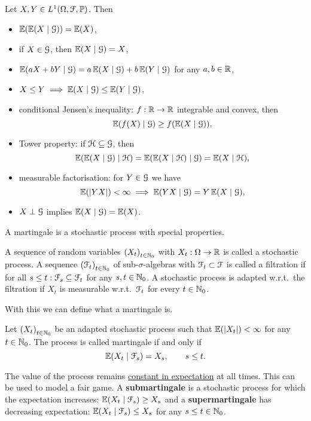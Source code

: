 \documentclass[12pt]{amsart}
\begin{document}
\begin{lemma}
    Let \(X, Y \in L^1(\Omega, \mathcal{F}, \mathbb{P})\). Then
    \begin{itemize}
        \item \(\operatorname{\mathbb{E}}(\operatorname{\mathbb{E}}(X \mid \mathcal{G})) = \operatorname{\mathbb{E}}(X)\),
        \item if \(X \in \mathcal{G}\), then \(\operatorname{\mathbb{E}}(X \mid \mathcal{G}) = X\),
        \item \(\operatorname{\mathbb{E}}(aX+bY \mid \mathcal{G}) = a \operatorname{\mathbb{E}}(X \mid \mathcal{G}) + b \operatorname{\mathbb{E}}(Y \mid \mathcal{G})\) for any \(a, b \in \mathbb{R}\),
        \item \(X \leq Y \implies \operatorname{\mathbb{E}}(X \mid \mathcal{G}) \leq \operatorname{\mathbb{E}}(Y \mid \mathcal{G})\),
        \item conditional Jensen's inequality: \(f: \mathbb{R} \to \mathbb{R}\) integrable and convex, then \[
            \operatorname{\mathbb{E}}(f(X) \mid \mathcal{G}) \geq f(\operatorname{\mathbb{E}}(X \mid \mathcal{G})),
        \]
        \item Tower property: if \(\mathcal{H} \subseteq \mathcal{G}\), then \[
            \operatorname{\mathbb{E}}(\operatorname{\mathbb{E}}(X \mid \mathcal{G}) \mid \mathcal{H}) = \operatorname{\mathbb{E}}(\operatorname{\mathbb{E}}(X \mid \mathcal{H}) \mid \mathcal{G}) = \operatorname{\mathbb{E}}(X \mid \mathcal{H}),
        \]
        \item measurable factorisation: for \(Y \in \mathcal{G}\) we have \[
            \E (\abs[YX]) < \infty \implies \E(YX \mid \cG) = Y \E(X \mid \cG),
        \]
        \item \(X \perp \mathcal{G}\) implies \(\operatorname{\mathbb{E}}(X \mid \mathcal{G}) = \operatorname{\mathbb{E}}(X)\).
    \end{itemize}
\end{lemma}

A martingale is a stochastic process with special properties.

\begin{definition}
    A sequence of random variables \(\left(X_t\right)_{t \in \mathbb{N}_0}\) with \(X_t: \Omega \to \mathbb{R}\) is called a stochastic process. A sequence \(\left(\mathcal{F}_t\right)_{t \in \mathbb{N}_0}\) of sub-\(\sigma\)-algebras with \(\mathcal{F}_t \subset \mathcal{F}\) is called a filtration if for all \(s \leq t: \mathcal{F}_s \subseteq \mathcal{F}_t\) for any \(s, t \in \mathbb{N}_0\). A stochastic process is adapted w.r.t.\ the filtration if \(X_t\) is measurable w.r.t.\ \(\mathcal{F}_t\) for every \(t \in \mathbb{N}_0\).
\end{definition}

With this we can define what a martingale is.

\begin{definition}[Martingale]
    Let \(\left(X_t\right)_{t \in \mathbb{N}_0}\) be an adapted stochastic process such that \(\E(\abs[X_t]) < \infty\) for any \(t \in \mathbb{N}_0\). The process is called martingale if and only if
    \begin{equation}\label{eq:martingale}
        \operatorname{\mathbb{E}}(X_t \mid \mathcal{F}_s) = X_s,\qquad s \leq t.
    \end{equation}
\end{definition}
\begin{remark}[Interpretation]
    The value of the process remains \underline{constant in expectation} at all times. This can be used to model a fair game.
    A \textbf{submartingale} is a stochastic process for which the expectation increases: \(\operatorname{\mathbb{E}}(X_t \mid \mathcal{F}_s) \geq X_s\)
    and a \textbf{supermartingale} has decreasing expectation: \(\operatorname{\mathbb{E}}(X_t \mid \mathcal{F}_s) \leq X_s\) for any \(s \leq t \in \mathbb{N}_0\).
\end{remark}
\end{document}
